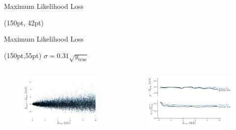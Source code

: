 \documentclass[10pt]{beamer}
\begin{document}
\begin{frame}{Maximum Likelihood Loss}
    \begin{textblock*}{300pt}(150pt, 42pt)
      
    \end{textblock*}
\end{frame}

\begin{frame}{Maximum Likelihood Loss}
  \begin{textblock*}{150pt}(150pt,55pt)
    $\sigma = 0.31 \sqrt{y_{\text{true}}}$
  \end{textblock*}
  \begin{columns}
    \begin{figure}[htp]
      \includegraphics[width=1.1\textwidth]{../images/likelihood.pdf}
    \end{figure}
    \begin{figure}[htp]
      \includegraphics[width=1.1\textwidth]{../images/likelihood_res.pdf}
    \end{figure}
  \end{columns}
\end{frame}
\end{document}
